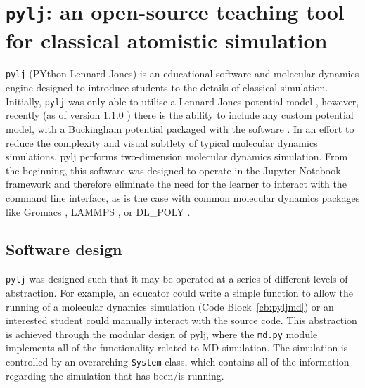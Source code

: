\section{\texttt{pylj}: an open-source teaching tool for classical atomistic simulation}

\texttt{pylj} (PYthon Lennard-Jones) \cite{mccluskey_pylj_2018,mccluskey_arm61/pylj_2019-2} is an educational software and molecular dynamics engine designed to introduce students to the details of classical simulation.
Initially, \texttt{pylj} was only able to utilise a Lennard-Jones potential model \cite{lennard-jones_determination_1924}, however, recently (as of version 1.1.0 \cite{mccluskey_arm61/pylj_2018}) there is the ability to include any custom potential model, with a Buckingham potential packaged with the software \cite{buckingham_classical_1938}.
In an effort to reduce the complexity and visual subtlety of typical molecular dynamics simulations, pylj performs two-dimension molecular dynamics simulation.
From the beginning, this software was designed to operate in the Jupyter Notebook framework and therefore eliminate the need for the learner to interact with the command line interface, as is the case with common molecular dynamics packages like Gromacs \cite{berendsen_gromacs_1995}, LAMMPS \cite{plimpton_fast_1995}, or DL\_POLY \cite{smith_dl_poly_2002}.

\subsection{Software design}
\texttt{pylj} was designed such that it may be operated at a series of different levels of abstraction.
For example, an educator could write a simple function to allow the running of a molecular dynamics simulation (Code Block~\ref{cb:pyljmd}) or an interested student could manually interact with the source code.
This abstraction is achieved through the modular design of pylj, where the \texttt{md.py} module implements all of the functionality related to MD simulation.
The simulation is controlled by an overarching \texttt{System} class, which contains all of the information regarding the simulation that has been/is running.
%
\begin{figure}
    \centering
        
\end{figure}
%

